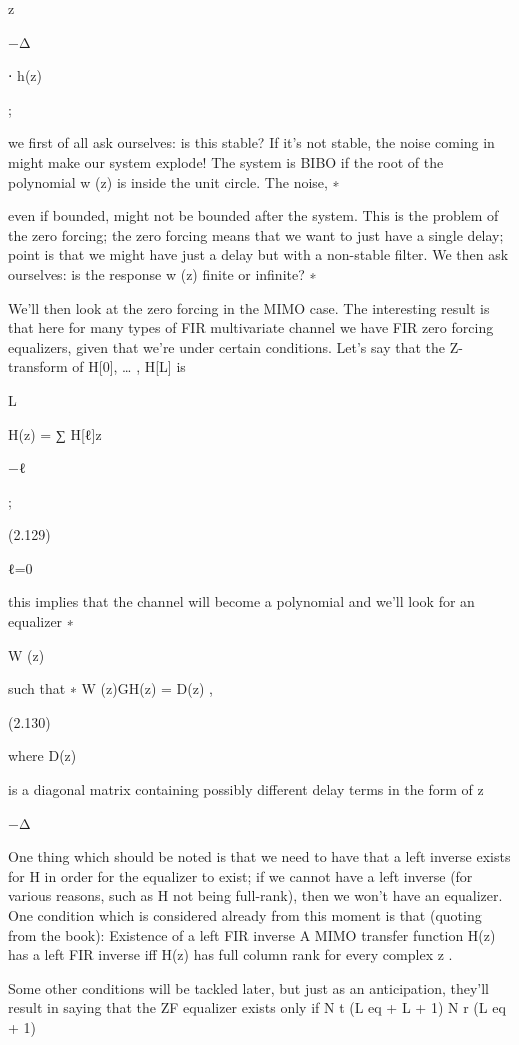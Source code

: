 {z

−Δ

⋅
h(z)

;
\sqrtG

we first of all ask ourselves: is this stable? If it's not stable, the noise coming in might make our system explode!
The system is BIBO if the root of the polynomial w (z) is inside the unit circle. The noise,
∗

even if bounded, might not be bounded after the system.
This is the problem of the zero forcing; the zero forcing means that we want to just have a single delay; point is that we might have just a delay but with a non-stable filter.
We then ask ourselves: is the response w (z) finite or infinite?
∗

We'll then look at the zero forcing in the MIMO case. The interesting result is that here for many types of FIR multivariate channel we have FIR zero forcing equalizers, given that we're under certain conditions.
Let's say that the Z-transform of H[0], … , H[L] is

L

H(z) = ∑ H[ℓ]z

−ℓ

;

(2.129)

ℓ=0

this implies that the channel will become a polynomial and we'll look for an equalizer
∗

W (z)

such that
∗
W (z)\sqrt GH(z) = D(z) ,

(2.130)

where D(z)

is a diagonal matrix containing possibly different delay terms in the form of z

−Δ

One thing which should be noted is that we need to have that a left inverse exists for H in order for the equalizer to exist; if we cannot have a left inverse (for various reasons,
such as H not being full-rank), then we won't have an equalizer.
One condition which is considered already from this moment is that (quoting from the book):
Existence of a left FIR inverse A MIMO transfer function H(z) has a left FIR inverse iff H(z) has full column rank for every complex z .

Some other conditions will be tackled later, but just as an anticipation, they'll result in saying that the ZF equalizer exists only if N t (L eq + L + 1) \leq N r (L eq + 1)

}
